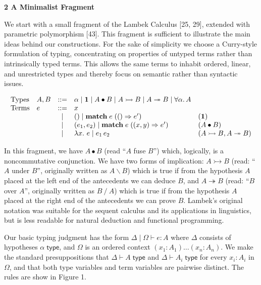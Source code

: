 
 
\par\medskip\noindent\textbf{2 A Minimalist Fragment}\par
 
 
We start with a small fragment of the Lambek Calculus [25, 29], extended with parametric polymorphism [43]. This fragment is sufficient to illustrate the main ideas behind our constructions. For the sake of simplicity we choose a Curry-style formulation of typing, concentrating on properties of untyped terms rather than intrinsically typed terms. This allows the same terms to inhabit ordered, linear, and unrestricted types and thereby focus on semantic rather than syntactic issues.\par
  
\par  \quad  \[\begin{array}[]{llcll}\mbox{Types}&A,B&::=&\alpha\mid\mathbf{1}\mid A\bullet B\mid A\rightarrowtail B\mid A\twoheadrightarrow B\mid\forall\alpha.\,A\\
\mbox{Terms}&e&::=&x\\
&&\mid&()\mid\mathbf{match}\;e\;(()\Rightarrow e^{\prime})&(\mathbf{1})\\
&&\mid&(e_{1},e_{2})\mid\mathbf{match}\;e\;((x,y)\Rightarrow e^{\prime})&(A\bullet B)\\
&&\mid&\lambda x.\ e\mid e_{1}\,e_{2}&(A\rightarrowtail B,A\twoheadrightarrow B)\end{array}\]\quad  \quad  
  
In this fragment, we have $A\bullet B$ (read “$A$ fuse $B$”) which, logically, is a noncommutative conjunction. We have two forms of implication: $A\rightarrowtail B$ (read: “$A$ under $B$”, originally written as $A\mathbin{\backslash}B$) which is true if from the hypothesis $A$ placed at the left end of the antecedents we can deduce $B$, and $A\twoheadrightarrow B$ (read: “$B$ over $A$”, originally written as $B\mathbin{/}A$) which is true if from the hypothesis $A$ placed at the right end of the antecedents we can prove $B$. Lambek’s original notation was suitable for the sequent calculus and its applications in linguistics, but is less readable for natural deduction and functional programming.\par
 
 
 
Our basic typing judgment has the form $\Delta\mid\Omega\vdash e:A$ where $\Delta$ consists of hypotheses $\alpha\;\mathsf{type}$, and $\Omega$ is an ordered context $(x_{1}:A_{1})\ldots(x_{n}:A_{n})$. We make the standard presuppositions that $\Delta\vdash A\;\mathsf{type}$ and $\Delta\vdash A_{i}\;\mathsf{type}$ for every $x_{i}:A_{i}$ in $\Omega$, and that both type variables and term variables are pairwise distinct. The rules are show in Figure 1.\par
 
